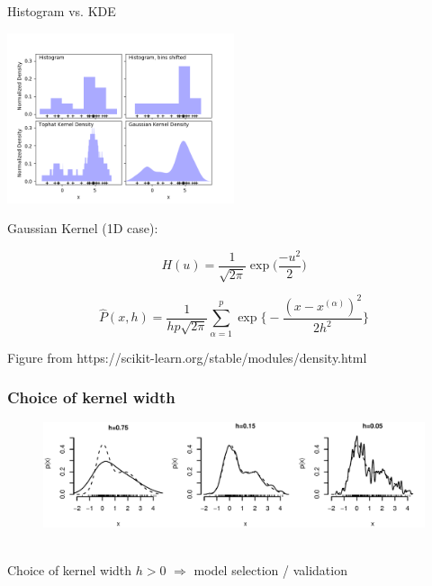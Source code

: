 \begin{frame}{Histogram vs. KDE}

\svspace{-3mm}

\begin{center}	
	\includegraphics[width=0.5\textwidth]{./img/sphx_glr_plot_kde_1d_0011}
\end{center}

\svspace{-3mm}

Gaussian Kernel (1D case):

\svspace{-3mm}

\begin{equation}
H(u) = \frac{1}{\sqrt{2\pi}} \exp\Big({\frac{-u^2}{2}}\Big)
\end{equation}

\begin{equation}
\widehat{P}({x}, h) = \frac{1}{h p \sqrt{2\pi}} \sum_{\alpha=1}^p \exp \Big\{ -\frac{(x-x^{(\alpha)})^2}{2h^2} \Big\}
\end{equation}

{\footnotesize
Figure from https://scikit-learn.org/stable/modules/density.html
}

\end{frame}

\subsubsection{Choice of kernel width}


\begin{frame}{\subsubsecname}

\begin{figure}
	\centering
	\includegraphics[width=\textwidth]{img/densExamples.pdf}\
\end{figure}

Choice of kernel width $h > 0$ $\Rightarrow$ model selection / validation


\end{frame}

